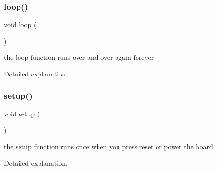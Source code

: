 \subsubsection{\texorpdfstring{loop()}{loop()}}
{\footnotesize\ttfamily void loop (\begin{DoxyParamCaption}{ }\end{DoxyParamCaption})}

the loop function runs over and over again forever

Detailed explanation. \mbox{\label{_blink-example_8ino_a4fc01d736fe50cf5b977f755b675f11d}} 
\subsubsection{\texorpdfstring{setup()}{setup()}}
{\footnotesize\ttfamily void setup (\begin{DoxyParamCaption}{ }\end{DoxyParamCaption})}

the setup function runs once when you press reset or power the board

Detailed explanation. 